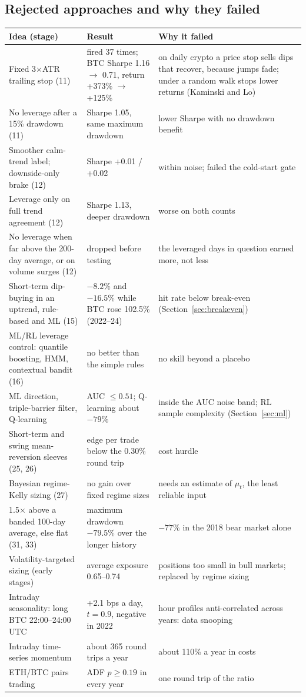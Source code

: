 \documentclass[11pt,a4paper]{article}
\theoremstyle{definition}
\begin{document}
\subsection{Rejected approaches and why they failed}
\begin{longtable}{@{}p{50mm}p{50mm}p{50mm}@{}}
\toprule
\textbf{Idea (stage)} & \textbf{Result} & \textbf{Why it failed}\\
\midrule\endhead
\bottomrule\endfoot
Fixed 3$\times$ATR trailing stop (11) & fired 37 times; BTC Sharpe 1.16 $\to$ 0.71, return +373\% $\to$ +125\% & on daily crypto a price stop sells dips that recover, because jumps fade; under a random walk stops lower returns (Kaminski and Lo)\\
No leverage after a 15\% drawdown (11) & Sharpe 1.05, same maximum drawdown & lower Sharpe with no drawdown benefit\\
Smoother calm-trend label; downside-only brake (12) & Sharpe +0.01 / +0.02 & within noise; failed the cold-start gate\\
Leverage only on full trend agreement (12) & Sharpe 1.13, deeper drawdown & worse on both counts\\
No leverage when far above the 200-day average, or on volume surges (12) & dropped before testing & the leveraged days in question earned more, not less\\
Short-term dip-buying in an uptrend, rule-based and ML (15) & $-8.2\%$ and $-16.5\%$ while BTC rose 102.5\% (2022--24) & hit rate below break-even (Section~\ref{sec:breakeven})\\
ML/RL leverage control: quantile boosting, HMM, contextual bandit (16) & no better than the simple rules & no skill beyond a placebo\\
ML direction, triple-barrier filter, Q-learning & AUC $\le0.51$; Q-learning about $-79\%$ & inside the AUC noise band; RL sample complexity (Section~\ref{sec:ml})\\
Short-term and swing mean-reversion sleeves (25, 26) & edge per trade below the 0.30\% round trip & cost hurdle\\
Bayesian regime-Kelly sizing (27) & no gain over fixed regime sizes & needs an estimate of $\mu_t$, the least reliable input\\
1.5$\times$ above a banded 100-day average, else flat (31, 33) & maximum drawdown $-79.5\%$ over the longer history & $-77\%$ in the 2018 bear market alone\\
Volatility-targeted sizing (early stages) & average exposure 0.65--0.74 & positions too small in bull markets; replaced by regime sizing\\
Intraday seasonality: long BTC 22:00--24:00 UTC & +2.1 bps a day, $t=0.9$, negative in 2022 & hour profiles anti-correlated across years: data snooping\\
Intraday time-series momentum & about 365 round trips a year & about 110\% a year in costs\\
ETH/BTC pairs trading & ADF $p\ge0.19$ in every year & one round trip of the ratio\\
\end{longtable}
\end{document}
